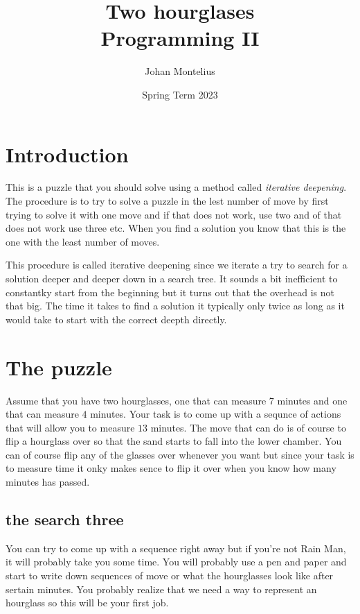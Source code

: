 \documentclass[a4paper,11pt]{article}
\begin{document}
\title{
    \textbf{Two hourglases}\\
    \large{Programming II}
}
\author{Johan Montelius}
\date{Spring Term 2023}
\maketitle
{}


\section*{Introduction}

This is a puzzle that you should solve using a method called {\em
  iterative deepening}. The procedure is to try to solve a puzzle in
the lest number of move by first trying to solve it with one move and
if that does not work, use two and of that does not work use three
etc. When you find a solution you know that this is the one with the
least number of moves.

This procedure is called iterative deepening since we iterate a try to
search for a solution deeper and deeper down in a search tree. It
sounds a bit inefficient to constantky start from the beginning but it
turns out that the overhead is not that big. The time it takes to find
a solution it typically only twice as long as it would take to start
with the correct deepth directly.

\section*{The puzzle}

Assume that you have two hourglasses, one that can measure $7$ minutes
and one that can measure $4$ minutes. Your task is to come up with a
sequnce of actions that will allow you to measure $13$ minutes. The
move that can do is of course to flip a hourglass over so that the
sand starts to fall into the lower chamber. You can of course flip any
of the glasses over whenever you want but since your task is to
measure time it onky makes sence to flip it over when you know how
many minutes has passed.

\subsection*{the search three}

You can try to come up with a sequence right away but if you're not
Rain Man, it will probably take you some time. You will probably use a
pen and paper and start to write down sequences of move or what the
hourglasses look like after sertain minutes. You probably realize that
we need a way to represent an hourglass so this will be your first job.
\end{document}
